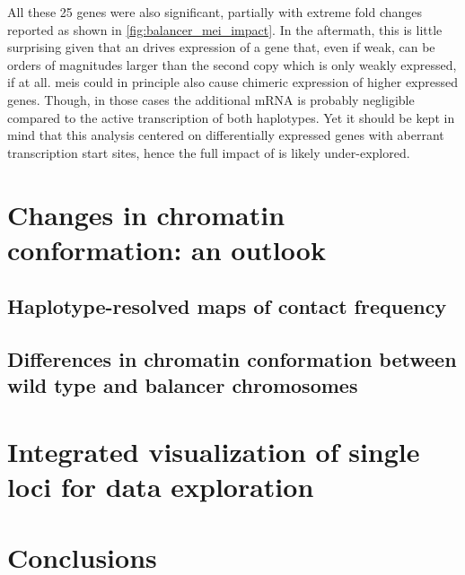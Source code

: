 
All these 25 genes were also significant, partially with extreme fold changes
reported as shown in \cref{fig:balancer_mei_impact}. In the aftermath, this is
little surprising given that an \mei drives expression of a gene that, even if
weak, can be orders of magnitudes larger than the second copy which is only
weakly expressed, if at all. \Acp{mei} could in principle also cause chimeric
expression of higher expressed genes. Though, in those cases the additional
mRNA is probably negligible compared to the active transcription of both
haplotypes. Yet it should be kept in mind that this analysis centered on
differentially expressed genes with aberrant transcription start sites, hence
the full impact of \mei is likely under-explored.







\section{Changes in chromatin conformation: an outlook}
\label{sec:balancer_cc}

\subsection{Haplotype-resolved maps of contact frequency}
\label{sec:balancer_cc_impl}

\subsection{Differences in chromatin conformation between wild type and balancer chromosomes}
\label{sec:balancer_cc_differences}



\section{Integrated visualization of single loci for data exploration}
\label{sec:balancer_visualization}


\section{Conclusions}
\label{sec:balancer_concl}
